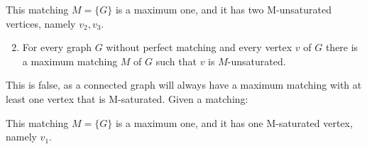 \documentclass[a4paper]{article}
\begin{document}
\begin{enumerate}
\begin{center}
\end{center}

This matching $M = \{G\}$ is a maximum one, and it has two M-unsaturated vertices, namely $v_2, v_3$.
  
  \begin{enumerate}
    \setcounter{enumii}{1}
  \item For every graph $G$ without perfect matching and every vertex $v$ of
        $G$ there is a maximum matching $M$ of $G$ such that $v$ is
        $M$-unsaturated.
  \end{enumerate}
  This is false, as a connected graph will always have a maximum matching with at least one vertex that is M-saturated. Given a matching: \\
  \begin{center}
\end{center}

This matching $M = \{G\}$ is a maximum one, and it has one M-saturated vertex, namely $v_1$.

\end{enumerate}
\end{document}

